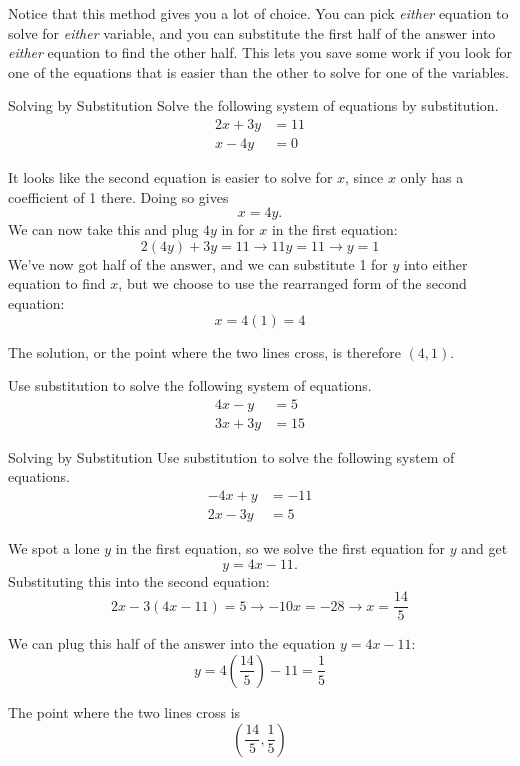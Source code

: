 Notice that this method gives you a lot of choice.  You can pick \emph{either} equation to solve for \emph{either} variable, and you can substitute the first half of the answer into \emph{either} equation to find the other half.  This lets you save some work if you look for one of the equations that is easier than the other to solve for one of the variables.
\pagebreak

\begin{example}[https://www.youtube.com/watch?v=ggZkBtnvLn0]{Solving by Substitution}
Solve the following system of equations by substitution.
\begin{align*}
2x+3y &= 11\\
x-4y &= 0
\end{align*}

\sol
It looks like the second equation is easier to solve for $x$, since $x$ only has a coefficient of 1 there.  Doing so gives \[x=4y.\]
We can now take this and plug $4y$ in for $x$ in the first equation:
\[2(4y)+3y=11 \longrightarrow 11y=11 \longrightarrow y=1\]
We've now got half of the answer, and we can substitute 1 for $y$ into either equation to find $x$, but we choose to use the rearranged form of the second equation:
\[x=4(1) = 4\]

The solution, or the point where the two lines cross, is therefore $(4,1)$.
\end{example}

\begin{try}
Use substitution to solve the following system of equations.
\begin{align*}
4x-y &= 5\\
3x+3y &= 15
\end{align*}
\end{try}

\begin{example}[https://www.youtube.com/watch?v=HqyePXNyhRU]{Solving by Substitution}
Use substitution to solve the following system of equations.
\begin{align*}
-4x+y &= -11\\
2x-3y &= 5
\end{align*}

\sol
We spot a lone $y$ in the first equation, so we solve the first equation for $y$ and get \[y=4x-11.\]
Substituting this into the second equation:
\[2x-3(4x-11)=5 \longrightarrow -10x=-28 \longrightarrow x=\frac{14}{5}\]

We can plug this half of the answer into the equation $y=4x-11$:
\[y=4\left(\frac{14}{5}\right)-11 = \frac{1}{5}\]

The point where the two lines cross is
\[\left(\frac{14}{5},\frac{1}{5}\right)\]
\end{example}

